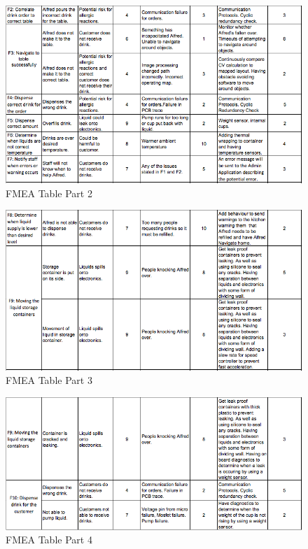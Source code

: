 \documentclass [10pt]{article}
\begin{document}
\begin{figure} [H]
	\centering
	\includegraphics [scale = 0.7] {figures/FMEA_2.png}
	\caption{FMEA Table Part 2}
\end{figure}

\begin{figure} [H]
	\centering
	\includegraphics [scale = 0.7] {figures/FMEA_3.png}
	\caption{FMEA Table Part 3}
\end{figure}

\begin{figure} [H]
	\centering
	\includegraphics [scale = 0.7] {figures/FMEA_4.png}
	\caption{FMEA Table Part 4}
\end{figure}
\end{document}
